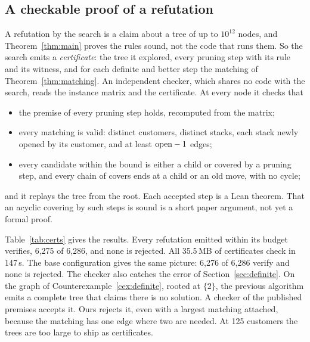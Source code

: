 \subsection{A checkable proof of a refutation}
\label{sec:certs}

A refutation by the search is a claim about a tree of up to $10^{12}$ nodes,
and Theorem~\ref{thm:main} proves the rules sound, not the code that runs
them. So the search emits a \emph{certificate}: the tree it explored, every
pruning step with its rule and its witness, and for each definite and better
step the matching of Theorem~\ref{thm:matching}. An independent checker, which
shares no code with the search, reads the instance matrix and the certificate.
At every node it checks that
\begin{itemize}
\item the premise of every pruning step holds, recomputed from the matrix;
\item every matching is valid: distinct customers, distinct stacks, each stack
  newly opened by its customer, and at least $\mathrm{open}-1$ edges;
\item every candidate within the bound is either a child or covered by a
  pruning step, and every chain of covers ends at a child or an old move,
  with no cycle;
\end{itemize}
and it replays the tree from the root. Each accepted step is a Lean theorem.
That an acyclic covering by such steps is sound is a short paper argument, not
yet a formal proof.

\begin{table}[t]
\centering\small
\caption{Every certificate the search emitted verifies, none is rejected, and
checking takes milliseconds. Certificates for our corrected rules, configuration
with better move, refuting the optimum minus one on the certified MOSP corpus
at 9--75 customers, with 60\,s to emit each. \emph{Not emitted}: the emitter
did not finish in time. Size is the compressed certificate; check time is the
independent checker's.}
\label{tab:certs}
\resizebox{\linewidth}{!}{}
\end{table}

Table~\ref{tab:certs} gives the results. Every refutation emitted within its
budget verifies, 6,275 of 6,286, and none is rejected. All 35.5\,MB of
certificates check in 147\,s. The base configuration gives the same picture:
6,276 of 6,286 verify and none is rejected. The checker also catches the error
of Section~\ref{sec:definite}. On the graph of
Counterexample~\ref{cex:definite}, rooted at $\{2\}$, the previous algorithm emits
a complete tree that claims there is no solution. A checker of the published
premises accepts it. Ours rejects it, even with a largest matching attached,
because the matching has one edge where two are needed. At 125 customers the
trees are too large to ship as certificates.

